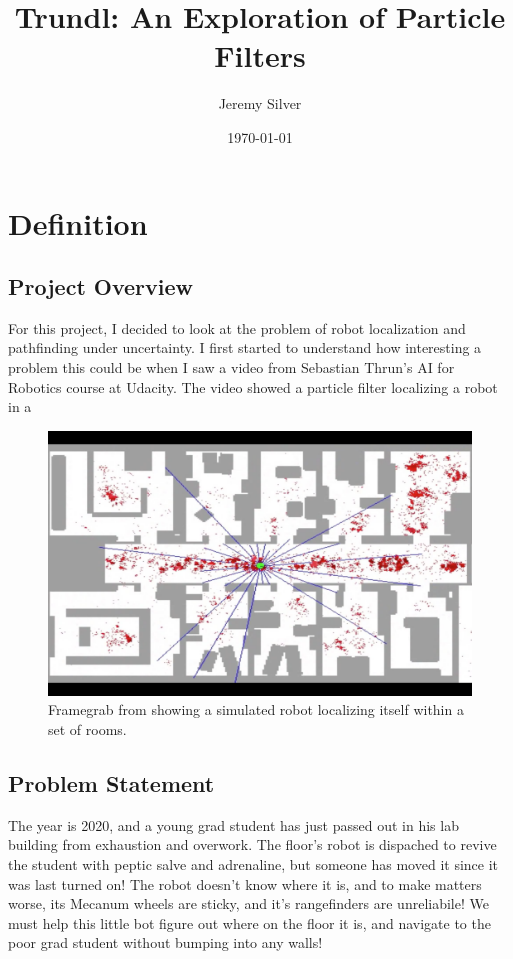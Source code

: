 \documentclass[letterpaper]{article}
\title{Trundl: An Exploration of Particle Filters}
\author{Jeremy Silver}
\date{\today}
\begin{document}
\maketitle

\abstract{}



\section{Definition}

\subsection{Project Overview}
\label{sec:overview}

For this project, I decided to look at the problem of robot localization and pathfinding under uncertainty. I first started to understand how interesting a problem this could be when I saw a video from Sebastian Thrun's AI for Robotics course at Udacity. The video showed a particle filter localizing a robot in a 


\begin{figure}\label{fig:localization-example}
  \centering
  \includegraphics[width=.5\linewidth]{images/localization-example.png}

\caption{Framegrab from \cite{youtube} showing a simulated robot localizing itself within a set of rooms.}

\end{figure}

\subsection{Problem Statement}

The year is 2020, and a young grad student has just passed out in his lab building from exhaustion and overwork. The floor's robot is dispached to revive the student with peptic salve and adrenaline, but someone has moved it since it was last turned on! The robot doesn't know where it is, and to make matters worse, its Mecanum wheels \cite{Diegel02tlale} are sticky, and it's rangefinders are unreliabile! We must help this little bot figure out where on the floor it is, and navigate to the poor grad student without bumping into any walls!
\end{document}
